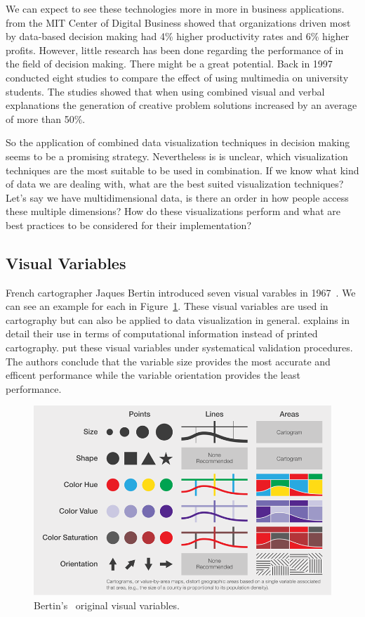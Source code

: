 We can expect to see these technologies more in more in business applications.
\textcite{McAfee2012} from the MIT Center of Digital Business showed that organizations driven most by data-based decision making had 4\% higher productivity rates and 6\% higher profits.
However, little research has been done regarding the performance of \cmvs{} in the field of decision making.
There might be a great potential.
Back in 1997 \textcite{Mayer1997} conducted eight studies to compare the effect of using multimedia on university students.
The studies showed that when using combined visual and verbal explanations the generation of creative problem solutions increased by an average of more than 50\%.

So the application of combined data visualization techniques in decision making seems to be a promising strategy.
Nevertheless is is unclear, which visualization techniques are the most suitable to be used in combination.
If we know what kind of data we are dealing with, what are the best suited visualization techniques?
Let's say we have multidimensional data, is there an order in how people access these multiple dimensions?
How do these visualizations perform and what are best practices to be considered for their implementation?


\subsection{Visual Variables}\label{sec:theory:visual-variables}
French cartographer Jaques Bertin introduced seven visual varables in 1967~\cite{Bertin2010}.
We can see an example for each in Figure~\ref{fig:theory:visual-variables}.
These visual variables are used in cartography but can also be applied to data visualization in general.
\textcite{Carpendale2003} explains in detail their use in terms of computational information instead of printed cartography.
\textcite{Garlandini2009} put these visual variables under systematical validation procedures.
The authors conclude that the variable size provides the most accurate and efficent performance while the variable orientation provides the least performance.
\begin{figure}[h!]
  \centering
  \includegraphics[width=\textwidth]{images/visual-variables.png}
  \caption{Bertin's~\cite{Bertin2010} original visual variables.}\label{fig:theory:visual-variables}
\end{figure}

